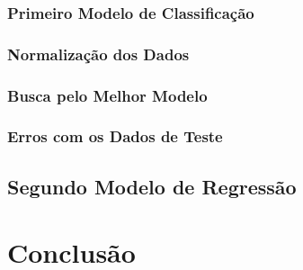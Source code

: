 \documentclass[final,5p]{elsarticle}
\numberwithin{equation}{section}
\begin{document}
        \subsubsection{Primeiro Modelo de Classificação}

        \subsubsection{Normalização dos Dados}

        \subsubsection{Busca pelo Melhor Modelo}

        \subsubsection{Erros com os Dados de Teste} \label{sec:testes_modelo}


    \subsection{Segundo Modelo de Regressão}


\section{Conclusão}


\appendix













\end{document}
